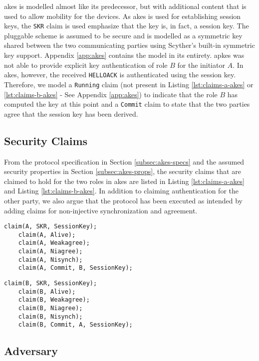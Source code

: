 \gls{akes} is modelled almost like its predecessor, but with additional content that is used to allow mobility for the devices. As \gls{akes} is used for establishing session keys, the \texttt{SKR} claim is used emphasize that the key is, in fact, a session key. The pluggable scheme is assumed to be secure and is modelled as a symmetric key shared between the two communicating parties using Scyther's built-in symmetric key support. Appendix \ref{app:akes} contains the model in its entirety. \gls{apkes} was not able to provide explicit key authentication of role $B$ for the initiator $A$. In \gls{akes}, however, the received \texttt{HELLOACK} is authenticated using the session key. Therefore, we model a \texttt{Running} claim (not present in Listing \ref{lst:claims-a-akes} or \ref{lst:claims-b-akes} - See Appendix \ref{app:akes}) to indicate that the role $B$ has computed the key at this point and a \texttt{Commit} claim to state that the two parties agree that the session key has been derived.

\subsection{Security Claims}

From the protocol specification in Section \ref{subsec:akes-specs} and the assumed security properties in Section \ref{subsec:akes-props}, the security claims that are claimed to hold for the two roles in \gls{akes} are listed in Listing \ref{lst:claims-a-akes} and Listing \ref{lst:claims-b-akes}. In addition to claiming authentication for the other party, we also argue that the protocol has been executed as intended by adding claims for non-injective synchronization and agreement.\\

\begin{lstlisting}[caption={Security claims for role A in AKES.}, label={lst:claims-a-akes}]
	claim(A, SKR, SessionKey);
	claim(A, Alive);
	claim(A, Weakagree);
	claim(A, Niagree);
	claim(A, Nisynch);
	claim(A, Commit, B, SessionKey);
\end{lstlisting}


\begin{lstlisting}[caption={Security claims for role B in AKES.}, label={lst:claims-b-akes}]
	claim(B, SKR, SessionKey);
	claim(B, Alive);
	claim(B, Weakagree);
	claim(B, Niagree);
	claim(B, Nisynch);
	claim(B, Commit, A, SessionKey);
\end{lstlisting}

\subsection{Adversary}


